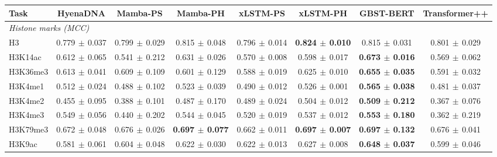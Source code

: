 \begin{tabular}{lccccccc}
\toprule
Task & HyenaDNA & Mamba-PS & Mamba-PH & xLSTM-PS & xLSTM-PH & GBST-BERT & Transformer++ \\
\midrule
\multicolumn{8}{l}{\emph{Histone marks (MCC)}} \\
H3 & 0.779{\scriptsize$\,\pm\,$0.037} & 0.799{\scriptsize$\,\pm\,$0.029} & 0.815{\scriptsize$\,\pm\,$0.048} & 0.796{\scriptsize$\,\pm\,$0.014} & \textbf{0.824{\scriptsize$\,\pm\,$0.010}} & 0.815{\scriptsize$\,\pm\,$0.031} & 0.801{\scriptsize$\,\pm\,$0.029} \\
H3K14ac & 0.612{\scriptsize$\,\pm\,$0.065} & 0.541{\scriptsize$\,\pm\,$0.212} & 0.631{\scriptsize$\,\pm\,$0.026} & 0.570{\scriptsize$\,\pm\,$0.008} & 0.598{\scriptsize$\,\pm\,$0.017} & \textbf{0.673{\scriptsize$\,\pm\,$0.016}} & 0.569{\scriptsize$\,\pm\,$0.062} \\
H3K36me3 & 0.613{\scriptsize$\,\pm\,$0.041} & 0.609{\scriptsize$\,\pm\,$0.109} & 0.601{\scriptsize$\,\pm\,$0.129} & 0.588{\scriptsize$\,\pm\,$0.019} & 0.625{\scriptsize$\,\pm\,$0.010} & \textbf{0.655{\scriptsize$\,\pm\,$0.035}} & 0.591{\scriptsize$\,\pm\,$0.032} \\
H3K4me1 & 0.512{\scriptsize$\,\pm\,$0.024} & 0.488{\scriptsize$\,\pm\,$0.102} & 0.523{\scriptsize$\,\pm\,$0.039} & 0.490{\scriptsize$\,\pm\,$0.012} & 0.526{\scriptsize$\,\pm\,$0.001} & \textbf{0.565{\scriptsize$\,\pm\,$0.038}} & 0.481{\scriptsize$\,\pm\,$0.037} \\
H3K4me2 & 0.455{\scriptsize$\,\pm\,$0.095} & 0.388{\scriptsize$\,\pm\,$0.101} & 0.487{\scriptsize$\,\pm\,$0.170} & 0.489{\scriptsize$\,\pm\,$0.024} & 0.504{\scriptsize$\,\pm\,$0.012} & \textbf{0.509{\scriptsize$\,\pm\,$0.212}} & 0.367{\scriptsize$\,\pm\,$0.076} \\
H3K4me3 & 0.549{\scriptsize$\,\pm\,$0.056} & 0.440{\scriptsize$\,\pm\,$0.202} & 0.544{\scriptsize$\,\pm\,$0.045} & 0.520{\scriptsize$\,\pm\,$0.019} & 0.537{\scriptsize$\,\pm\,$0.012} & \textbf{0.553{\scriptsize$\,\pm\,$0.180}} & 0.362{\scriptsize$\,\pm\,$0.219} \\
H3K79me3 & 0.672{\scriptsize$\,\pm\,$0.048} & 0.676{\scriptsize$\,\pm\,$0.026} & \textbf{0.697{\scriptsize$\,\pm\,$0.077}} & 0.662{\scriptsize$\,\pm\,$0.011} & \textbf{0.697{\scriptsize$\,\pm\,$0.007}} & \textbf{0.697{\scriptsize$\,\pm\,$0.132}} & 0.676{\scriptsize$\,\pm\,$0.041} \\
H3K9ac & 0.581{\scriptsize$\,\pm\,$0.061} & 0.604{\scriptsize$\,\pm\,$0.048} & 0.622{\scriptsize$\,\pm\,$0.030} & 0.622{\scriptsize$\,\pm\,$0.013} & 0.627{\scriptsize$\,\pm\,$0.008} & \textbf{0.648{\scriptsize$\,\pm\,$0.037}} & 0.599{\scriptsize$\,\pm\,$0.046} \\

\end{tabular}
